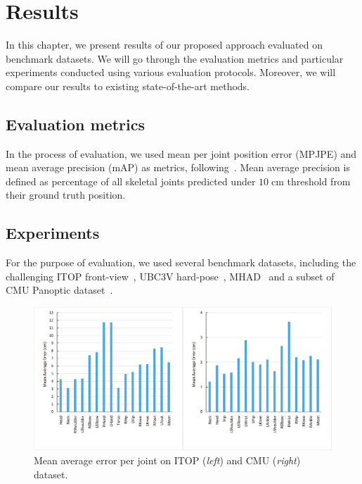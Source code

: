\chapter{Results}\label{chap:results}

In this chapter, we present results of our proposed approach evaluated on benchmark datasets. We will go through the evaluation metrics and particular experiments conducted using various evaluation protocols. Moreover, we will compare our results to existing state-of-the-art methods.\par

\section{Evaluation metrics}
In the process of evaluation, we used mean per joint position error (MPJPE) and mean average precision (mAP) as metrics, following~\cite{Ali19,haque2016viewpoint,Marin18jvcir,Shafaei16}. Mean average precision is defined as percentage of all skeletal joints predicted under $10 \; \mbox{cm}$ threshold from their ground truth position.\par

\section{Experiments}


For the purpose of evaluation, we used several benchmark datasets, including the challenging ITOP front-view~\cite{haque2016viewpoint}, UBC3V hard-pose~\cite{Shafaei16}, MHAD~\cite{Vidal:2013:BMC:2478277.2478412} and a subset of CMU Panoptic dataset~\cite{Joo_2017_TPAMI}.\par
\vspace{5mm}
\begin{figure}[H]
\begin{center}
\centering
\includegraphics[width=\textwidth]{images/results/perjointerr2.png}
\caption[Mean average error per joint on ITOP and CMU dataset.]{Mean average error per joint on ITOP ({\it left}) and CMU ({\it right}) dataset.}
\label{fig:perjointerr2}
\end{center}
\end{figure}

